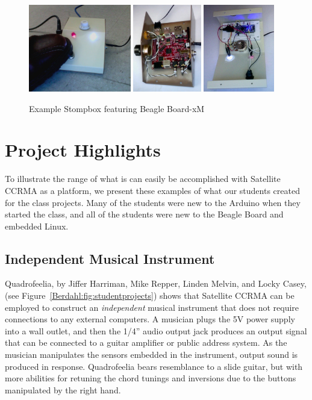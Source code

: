 \begin{figure}[t]
\centering
\includegraphics[height=1.5in]{Photos/Stompbox.eps}
\includegraphics[height=1.5in]{Photos/BottomFxPedal.eps}
\includegraphics[height=1.5in]{Photos/TopFxPedal.eps}
\caption{Example Stompbox featuring Beagle Board-xM}
\label{Berdahl:fig:Stomp}
\end{figure}

\section{Project Highlights}
To illustrate the range of what is can easily be accomplished with Satellite CCRMA as a platform, we present these examples of what our students created for the class projects. Many of the students were new to the Arduino when they started the class, and all of the students were new to the Beagle Board and embedded Linux.

\subsection{Independent Musical Instrument}
Quadrofeelia, by Jiffer Harriman, Mike Repper, Linden Melvin, and Locky Casey, (see Figure~\ref{Berdahl:fig:studentprojects}) shows that Satellite CCRMA can be employed to construct an \emph{independent} musical instrument that does not require connections to any external computers.  A musician plugs the 5V power supply into a wall outlet, and then the 1/4'' audio output jack produces an output signal that can be connected to a guitar amplifier or public address system.  As the musician manipulates the sensors embedded in the instrument, output sound is produced in response.  Quadrofeelia bears resemblance to a slide guitar, but with more abilities for retuning the chord tunings and inversions due to the buttons manipulated by the right hand.

